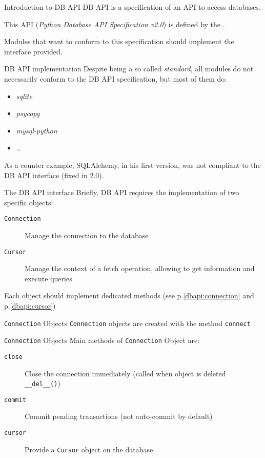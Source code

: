 \begin{frame}{Introduction to DB API}
  \alert{DB API} is a specification of an API to access databases.

  This API (\textit{Python Database API Specification v2.0}) is defined by the .
  
  Modules that want to conform to this specification should implement the interface provided.
\end{frame}

\begin{frame}{DB API implementation}
  Despite being a so called \textit{standard}, all modules do not necessarily conform to the DB API specification, but most of them do:
  \begin{itemize}
    \item \textit{sqlite}
    \item \textit{psycopg}
    \item \textit{mysql-python}
    \item \dots
  \end{itemize}

  As a counter example, SQLAlchemy, in his first version, was not compliant to the DB API interface (fixed in 2.0).
\end{frame}

\begin{frame}{The DB API interface}
    Briefly, DB API requires the implementation of two specific objects:
    \begin{description}
      \item[\texttt{Connection}] Manage the connection to the database
      \item[\texttt{Cursor}] Manage the context of a fetch operation, allowing to get information and execute queries 
    \end{description}
    Each object should implement dedicated methods (see p.\ref{dbapi:connection} and p.\ref{dbapi:cursor})

\end{frame}

\begin{frame}{\texttt{Connection} Objects}
  \texttt{Connection} objects are created with the method \texttt{connect}


\end{frame}

\begin{frame}{\texttt{Connection} Objects}\label{dbapi:connection}
  Main methods of \texttt{Connection} Object are:
  \begin{description}
    \item[\texttt{close}] Close the connection immediately (called when object is deleted \texttt{\_\_del\_\_()})
    \item[\texttt{commit}] Commit pending transactions (not auto-commit by default)
    \item[\texttt{cursor}] Provide a \texttt{Cursor} object on the database
  \end{description}
  
\end{frame}

